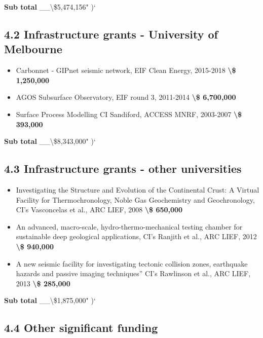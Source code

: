 \documentclass[
]{article}
\providecommand{\tightlist}{%
  \setlength{\itemsep}{0pt}\setlength{\parskip}{0pt}}
\begin{document}
\textbf{Sub total} \_\_\textbackslash\$5,474,156" )`

\hypertarget{infrastructure-grants---university-of-melbourne}{%
\subsection{4.2 Infrastructure grants - University of
Melbourne}\label{infrastructure-grants---university-of-melbourne}}

\begin{itemize}
\item
  Carbonnet - GIPnet seismic network, EIF Clean Energy, 2015-2018
  \textbf{\textbackslash\$ 1,250,000}
\item
  AGOS Subsurface Observatory, EIF round 3, 2011-2014
  \textbf{\textbackslash\$ 6,700,000}
\item
  Surface Process Modelling CI Sandiford, ACCESS MNRF, 2003-2007
  \textbf{\textbackslash\$ 393,000}
\end{itemize}

\textbf{Sub total} \_\_\textbackslash\$8,343,000" )`

\hypertarget{infrastructure-grants---other-universities}{%
\subsection{4.3 Infrastructure grants - other
universities}\label{infrastructure-grants---other-universities}}

\begin{itemize}
\tightlist
\item
  Investigating the Structure and Evolution of the Continental Crust: A
  Virtual Facility for Thermochronology, Noble Gas Geochemistry and
  Geochronology, CI's Vasconcelas et al., ARC LIEF, 2008
  \textbf{\textbackslash\$ 650,000}
\item
  An advanced, macro-scale, hydro-thermo-mechanical testing chamber for
  sustainable deep geological applications, CI's Ranjith et al., ARC
  LIEF, 2012 \textbf{\textbackslash\$ 940,000}
\item
  A new seismic facility for investigating tectonic collision zones,
  earthquake hazards and passive imaging techniques'' CI's Rawlinson et
  al., ARC LIEF, 2013 \textbf{\textbackslash\$ 285,000}
\end{itemize}

\textbf{Sub total} \_\_\textbackslash\$1,875,000" )`

\hypertarget{other-significant-funding}{%
\subsection{4.4 Other significant
funding}\label{other-significant-funding}}
\end{document}
